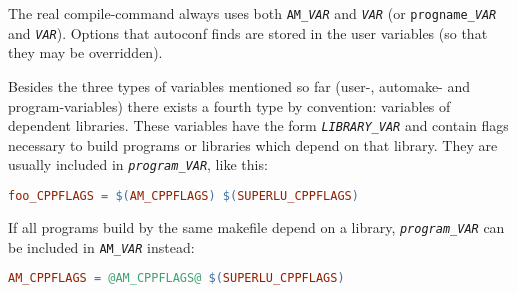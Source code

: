 \documentclass[11pt,a4paper,headinclude,footinclude,DIV16,normalheadings]{scrartcl}
\begin{document}
The real compile-command always uses both \texttt{AM\_\textit{VAR}} and
\texttt{\textit{VAR}} (or \texttt{\texttt{progname}\_\textit{VAR}} and
\texttt{\textit{VAR}}).  Options that
autoconf finds are stored in the user variables (so that they may be
overridden).

Besides the three types of variables mentioned so far (user-, automake- and
program-variables) there exists a fourth type by convention: variables of
dependent libraries.  These variables have the form
\texttt{\textit{LIBRARY}\_\textit{VAR}} and contain flags necessary to build
programs or libraries which depend on that library.  They are usually included
in \texttt{\textit{program}\_\textit{VAR}}, like this:
\begin{lstlisting}[language=make]
foo_CPPFLAGS = $(AM_CPPFLAGS) $(SUPERLU_CPPFLAGS)
\end{lstlisting}
If all programs build by the same makefile depend on a library,
\texttt{\textit{program}\_\textit{VAR}} can be included in
\texttt{AM\_\textit{VAR}} instead:
\begin{lstlisting}[language=make]
AM_CPPFLAGS = @AM_CPPFLAGS@ $(SUPERLU_CPPFLAGS)
\end{lstlisting}
\end{document}
